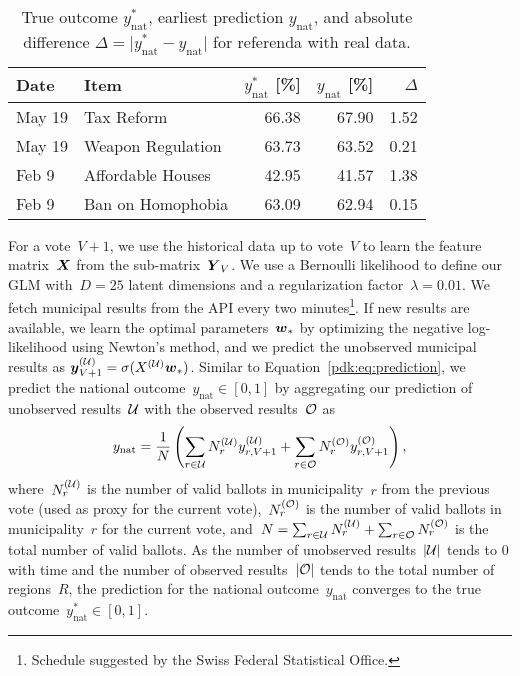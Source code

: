 \begin{table}
	\centering
	\caption{
		True outcome $y^*_{\textrm{nat}}$, earliest prediction $y_{\textrm{nat}}$, and absolute difference $\Delta = \vert y^*_{\textrm{nat}} - y_{\textrm{nat}} \vert $ for referenda with real data.
	}
	\label{pdk:tab:real_votes}
	\begin{tabular}{llrrr}
		\toprule
		Date   & Item              & $y^*_{\textrm{nat}}$ [\%] & $y_{\textrm{nat}}$ [\%] & $\Delta$ \\
		\midrule

		May 19 & Tax Reform        & 66.38                     & 67.90                   & 1.52     \\
		May 19 & Weapon Regulation & 63.73                     & 63.52                   & 0.21     \\
		Feb 9  & Affordable Houses & 42.95                     & 41.57                   & 1.38     \\
		Feb 9  & Ban on Homophobia & 63.09                     & 62.94                   & 0.15     \\

		\bottomrule
	\end{tabular}
\end{table}

For a vote~$V+1$, we use the historical data up to vote~$V$ to learn the feature matrix~$\mbox{$\mbox{$\boldsymbol{X}$}$}$ from the sub-matrix~$\mbox{$\mbox{$\boldsymbol{Y}$}$}_V$.
We use a Bernoulli likelihood to define our GLM with~$D=25$ latent dimensions and a regularization factor~$\lambda=0.01$.
We fetch municipal results from the API every two minutes\footnote{Schedule suggested by the Swiss Federal Statistical Office.}.
If new results are available, we learn the optimal parameters~$\mbox{$\mbox{$\boldsymbol{w}$}$}_*$ by optimizing the negative log-likelihood using Newton's method, and we predict the unobserved municipal results as $\mbox{$\mbox{$\boldsymbol{y}$}$}_{V+1}^{(\mathcal{U})} = \sigma(X^{(\mathcal{U})} \mbox{$\mbox{$\boldsymbol{w}$}$}_*)$.
Similar to Equation~\eqref{pdk:eq:prediction}, we predict the national outcome~$y_{\textrm{nat}} \in [0, 1]$ by aggregating our prediction of unobserved results~$\mathcal{U}$ with the observed results~$\mathcal{O}$ as
\begin{equation*}
	y_{\textrm{nat}} = \frac{1}{N} \left( \sum_{r \in \mathcal{U}} N_r^{(\mathcal{U})} y_{r, V+1}^{(\mathcal{U})} + \sum_{r \in \mathcal{O}} N_r^{(\mathcal{O})} y_{r, V+1}^{(\mathcal{O})} \right),
\end{equation*}
where~$N_r^{(\mathcal{U})}$ is the number of valid ballots in municipality~$r$ from the previous vote (used as proxy for the current vote),~$N_r^{(\mathcal{O})}$ is the number of valid ballots in municipality~$r$ for the current vote, and~$N = \sum_{r \in \mathcal{U}} N_r^{(\mathcal{U})} + \sum_{r \in \mathcal{O}} N_r^{(\mathcal{O})}$ is the total number of valid ballots.
As the number of unobserved results~$\vert \mathcal{U} \vert$ tends to 0 with time and the number of observed results~$\vert \mathcal{O} \vert$ tends to the total number of regions~$R$, the prediction for the national outcome~$y_{\textrm{nat}}$ converges to the true outcome~$y_{\textrm{nat}}^* \in [0, 1]$.

